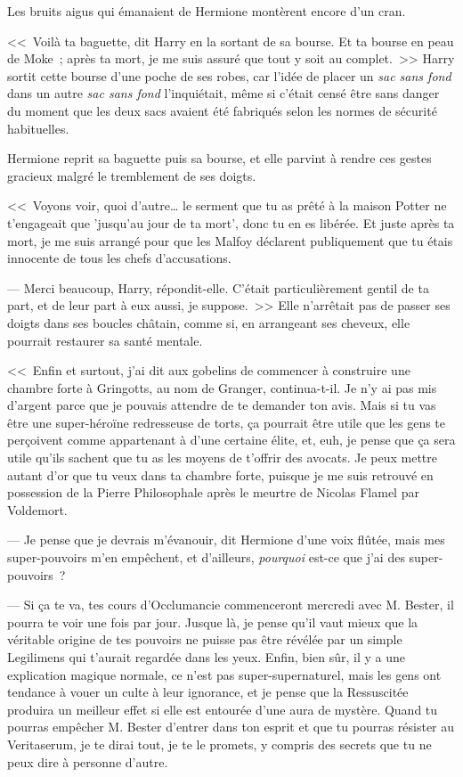 Les bruits aigus qui émanaient de Hermione montèrent encore d'un cran.

<<~Voilà ta baguette, dit Harry en la sortant de sa bourse. Et ta bourse en peau de Moke~; après ta mort, je me suis assuré que tout y soit au complet.~>> Harry sortit cette bourse d'une poche de ses robes, car l'idée de placer un \emph{sac sans fond} dans un autre \emph{sac sans fond} l'inquiétait, même si c'était censé être sans danger du moment que les deux sacs avaient été fabriqués selon les normes de sécurité habituelles.

Hermione reprit sa baguette puis sa bourse, et elle parvint à rendre ces gestes gracieux malgré le tremblement de ses doigts.

<<~Voyons voir, quoi d'autre… le serment que tu as prêté à la maison Potter ne t'engageait que 'jusqu'au jour de ta mort', donc tu en es libérée. Et juste après ta mort, je me suis arrangé pour que les Malfoy déclarent publiquement que tu étais innocente de tous les chefs d'accusations.

--- Merci beaucoup, Harry, répondit-elle. C'était particulièrement gentil de ta part, et de leur part à eux aussi, je suppose.~>> Elle n'arrêtait pas de passer ses doigts dans ses boucles châtain, comme si, en arrangeant ses cheveux, elle pourrait restaurer sa santé mentale.

<<~Enfin et surtout, j'ai dit aux gobelins de commencer à construire une chambre forte à Gringotts, au nom de Granger, continua-t-il. Je n'y ai pas mis d'argent parce que je pouvais attendre de te demander ton avis. Mais si tu vas être une super-héroïne redresseuse de torts, ça pourrait être utile que les gens te perçoivent comme appartenant à d'une certaine élite, et, euh, je pense que ça sera utile qu'ils sachent que tu as les moyens de t'offrir des avocats. Je peux mettre autant d'or que tu veux dans ta chambre forte, puisque je me suis retrouvé en possession de la Pierre Philosophale après le meurtre de Nicolas Flamel par Voldemort.

--- Je pense que je devrais m'évanouir, dit Hermione d'une voix flûtée, mais mes super-pouvoirs m'en empêchent, et d'ailleurs, \emph{pourquoi} est-ce que j'ai des super-pouvoirs~?

--- Si ça te va, tes cours d'Occlumancie commenceront mercredi avec M. Bester, il pourra te voir une fois par jour. Jusque là, je pense qu'il vaut mieux que la véritable origine de tes pouvoirs ne puisse pas être révélée par un simple Legilimens qui t'aurait regardée dans les yeux. Enfin, bien sûr, il y a une explication magique normale, ce n'est pas super-supernaturel, mais les gens ont tendance à vouer un culte à leur ignorance, et je pense que la Ressuscitée produira un meilleur effet si elle est entourée d'une aura de mystère. Quand tu pourras empêcher M. Bester d'entrer dans ton esprit et que tu pourras résister au Veritaserum, je te dirai tout, je te le promets, y compris des secrets que tu ne peux dire à personne d'autre.

